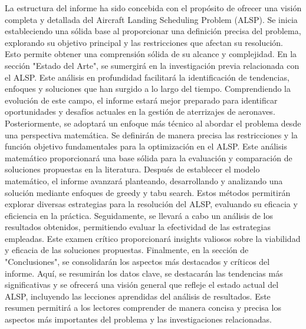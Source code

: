 \documentclass[letter, 10pt]{article}
\begin{document}
La estructura del informe ha sido concebida con el prop\'osito de ofrecer una visi\'on completa y detallada del Aircraft Landing Scheduling Problem (ALSP). Se inicia estableciendo una s\'olida base al proporcionar una definici\'on precisa del problema, explorando su objetivo principal y las restricciones que afectan su resoluci\'on. Esto permite obtener una comprensi\'on s\'olida de su alcance y complejidad. En la secci\'on "Estado del Arte", se sumergir\'a en la investigaci\'on previa relacionada con el ALSP. Este an\'alisis en profundidad facilitar\'a la identificaci\'on de tendencias, enfoques y soluciones que han surgido a lo largo del tiempo. Comprendiendo la evoluci\'on de este campo, el informe estar\'a mejor preparado para identificar oportunidades y desaf\'ios actuales en la gesti\'on de aterrizajes de aeronaves. Posteriormente, se adoptar\'a un enfoque m\'as t\'ecnico al abordar el problema desde una perspectiva matem\'atica. Se definir\'an de manera precisa las restricciones y la funci\'on objetivo fundamentales para la optimizaci\'on en el ALSP. Este an\'alisis matem\'atico proporcionar\'a una base s\'olida para la evaluaci\'on y comparaci\'on de soluciones propuestas en la literatura. Despu\'es de establecer el modelo matem\'atico, el informe avanzar\'a planteando, desarrollando y analizando una soluci\'on mediante enfoques de greedy y tabu search. Estos m\'etodos permitir\'an explorar diversas estrategias para la resoluci\'on del ALSP, evaluando su eficacia y eficiencia en la pr\'actica. Seguidamente, se llevar\'a a cabo un an\'alisis de los resultados obtenidos, permitiendo evaluar la efectividad de las estrategias empleadas. Este examen cr\'itico proporcionar\'a insights valiosos sobre la viabilidad y eficacia de las soluciones propuestas. Finalmente, en la secci\'on de "Conclusiones", se consolidar\'an los aspectos m\'as destacados y cr\'iticos del informe. Aqu\'i, se resumir\'an los datos clave, se destacar\'an las tendencias m\'as significativas y se ofrecer\'a una visi\'on general que refleje el estado actual del ALSP, incluyendo las lecciones aprendidas del an\'alisis de resultados. Este resumen permitir\'a a los lectores comprender de manera concisa y precisa los aspectos m\'as importantes del problema y las investigaciones relacionadas. \\
\end{document}
